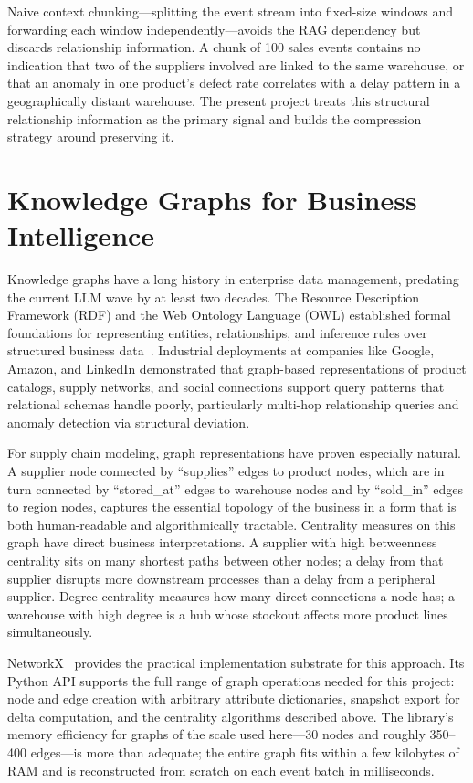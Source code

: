 Naive context chunking---splitting the event stream into fixed-size windows and forwarding
each window independently---avoids the RAG dependency but discards relationship information.
A chunk of 100 sales events contains no indication that two of the suppliers involved are
linked to the same warehouse, or that an anomaly in one product's defect rate correlates
with a delay pattern in a geographically distant warehouse. The present project treats
this structural relationship information as the primary signal and builds the compression
strategy around preserving it.

\section{Knowledge Graphs for Business Intelligence}
\label{sec:knowledge_graphs}

Knowledge graphs have a long history in enterprise data management, predating the current
LLM wave by at least two decades. The Resource Description Framework (RDF) and the Web
Ontology Language (OWL) established formal foundations for representing entities,
relationships, and inference rules over structured business data~\citep{berners2001semantic}.
Industrial deployments at companies like Google, Amazon, and LinkedIn demonstrated that
graph-based representations of product catalogs, supply networks, and social connections
support query patterns that relational schemas handle poorly, particularly multi-hop
relationship queries and anomaly detection via structural deviation.

For supply chain modeling, graph representations have proven especially natural. A supplier
node connected by ``supplies'' edges to product nodes, which are in turn connected by
``stored\_at'' edges to warehouse nodes and by ``sold\_in'' edges to region nodes, captures
the essential topology of the business in a form that is both human-readable and
algorithmically tractable. Centrality measures on this graph have direct business
interpretations. A supplier with high betweenness centrality sits on many shortest paths
between other nodes; a delay from that supplier disrupts more downstream processes than
a delay from a peripheral supplier. Degree centrality measures how many direct connections
a node has; a warehouse with high degree is a hub whose stockout affects more product lines
simultaneously.

NetworkX~\citep{hagberg2008networkx} provides the practical implementation substrate for
this approach. Its Python API supports the full range of graph operations needed for this
project: node and edge creation with arbitrary attribute dictionaries, snapshot export for
delta computation, and the centrality algorithms described above. The library's memory
efficiency for graphs of the scale used here---30 nodes and roughly 350--400 edges---is
more than adequate; the entire graph fits within a few kilobytes of RAM and is reconstructed
from scratch on each event batch in milliseconds.

